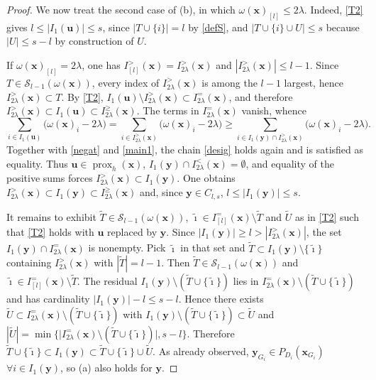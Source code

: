 \documentclass[11pt,a4paper]{article}
\theoremstyle{plain}
\theoremstyle{definition}
\theoremstyle{remark}
\newcommand*\x{\mathbf{x}}
\newcommand*\U{\mathbf{u}}
\newcommand*\y{\mathbf{y}}
\newcommand*\prox{\operatorname{prox}}
\begin{document}
\begin{proof}
  We now treat the second case of (b), in which \(\omega(\x)_{[l]}\leq 2\lambda\).
  Indeed, \eqref{T2} gives \(l\leq |I_1(\U)|\leq s\), since \(|T\cup \{i\}|=l\) by \eqref{defS}, and \(|T\cup\{i\}\cup U|\leq s\) because \(|U|\leq s-l\) by construction of \(U\).

  If \(\omega(\x)_{[l]}=2\lambda\), one has \(I_{[l]}^>(\x)=I_{2\lambda}^>(\x)\) and \(|I_{2\lambda}^>(\x)|\leq l-1\).
  Since \(T\in\mathcal{S}_{l-1}(\omega(\x))\), every index of \(I_{2\lambda}^>(\x)\) is among the \(l-1\) largest, hence \(I_{2\lambda}^>(\x)\subset T\).
  By \eqref{T2}, \(I_1(\U)\setminus I_{2\lambda}^>(\x)\subset I_{2\lambda}^=(\x)\), and therefore \(I_{2\lambda}^>(\x)\subset I_1(\U)\subset I_{2\lambda}^\geq(\x)\).
  The terms in \(I_{2\lambda}^=(\x)\) vanish, whence \[ \sum_{i\in I_1(\U)}\bigl(\omega(\x)_i-2\lambda\bigr)=\sum_{i\in I_{2\lambda}^>(\x)}\bigl(\omega(\x)_i-2\lambda\bigr)\geq\sum_{i\in I_1(\y)\cap I_{2\lambda}^>(\x)}\bigl(\omega(\x)_i-2\lambda\bigr).
  \]
  Together with \eqref{negat} and \eqref{main1}, the chain \eqref{desig} holds
  again and is satisfied as equality.
  Thus \(\U\in\prox_h(\x)\), \(I_1(\y)\cap I_{2\lambda}^<(\x)=\emptyset\), and equality of the positive sums forces \(I_{2\lambda}^>(\x)\subset I_1(\y)\).
  One obtains \(I_{2\lambda}^>(\x)\subset I_1(\y)\subset I_{2\lambda}^\geq(\x)\) and, since \(\y\in C_{l,s}\), \(l\leq |I_1(\y)|\leq s\).

  It remains to exhibit \(\tilde{T}\in\mathcal{S}_{l-1}(\omega(\x))\), \(\tilde{\imath}\in I^=_{[l]}(\x)\setminus\tilde{T}\) and \(\tilde{U}\) as in \eqref{T2} such that \eqref{T2} holds with \(\U\) replaced by \(\y\).
  Since \(|I_1(\y)|\geq l>|I_{2\lambda}^>(\x)|\), the set \(I_1(\y)\cap I_{2\lambda}^=(\x)\) is nonempty.
  Pick \(\tilde{\imath}\) in that set and \(\tilde{T}\subset I_1(\y)\setminus\{\tilde{\imath}\}\) containing \(I_{2\lambda}^>(\x)\) with \(|\tilde{T}|=l-1\).
  Then \(\tilde{T}\in\mathcal{S}_{l-1}(\omega(\x))\) and \(\tilde{\imath}\in I^=_{[l]}(\x)\setminus\tilde{T}\).
  The residual \(I_1(\y)\setminus(\tilde{T}\cup\{\tilde{\imath}\})\) lies in \(I_{2\lambda}^=(\x)\setminus(\tilde{T}\cup\{\tilde{\imath}\})\) and has cardinality \(|I_1(\y)|-l\leq s-l\).
  Hence there exists \(\tilde{U}\subset I_{2\lambda}^=(\x)\setminus(\tilde{T}\cup\{\tilde{\imath}\})\) with \(I_1(\y)\setminus(\tilde{T}\cup\{\tilde{\imath}\})\subset\tilde{U}\) and \(|\tilde{U}|=\min\bigl\{\bigl|I_{2\lambda}^=(\x)\setminus(\tilde{T}\cup\{\tilde{\imath}\})\bigr|,s-l\bigr\}\).
  Therefore \(\tilde{T}\cup\{\tilde{\imath}\}\subset I_1(\y)\subset\tilde{T}\cup\{\tilde{\imath}\}\cup\tilde{U}\).
  As already observed, \(\y_{G_i} \in P_{D_i}\left(\x_{G_i}\right)\) \(\forall i \in I_1(\y)\), so (a) also holds for \(\y\).


\end{proof}
\end{document}
